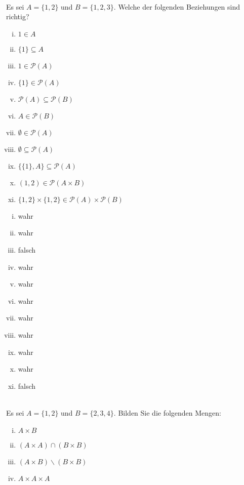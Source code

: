 \\
Es sei $A=\{1,2\}$ und $B=\{1,2,3\}$. Welche der folgenden Beziehungen sind richtig?
\begin{enumerate}[(i)]
  \item $1\in A$
  \item $\{1\}\subseteq A$
  \item $1\in\mathscr{P}(A)$
  \item $\{1\}\in\mathscr{P}(A)$
  \item $\mathscr{P}(A)\subseteq\mathscr{P}(B)$
  \item $A\in\mathscr{P}(B)$
  \item $\emptyset\in\mathscr{P}(A)$
  \item $\emptyset\subseteq\mathscr{P}(A)$
  \item $\{\{1\},A\}\subseteq\mathscr{P}(A)$
  \item $(1,2)\in\mathscr{P}(A\times B)$
  \item $\{1,2\}\times\{1,2\}\in\mathscr{P}(A)\times\mathscr{P}(B)$
\end{enumerate}

\begin{loesung}
  \begin{enumerate}[(i)]
    \item wahr
    \item wahr
    \item falsch
    \item wahr
    \item wahr
    \item wahr
    \item wahr
    \item wahr
    \item wahr
    \item wahr
    \item falsch
  \end{enumerate}
\end{loesung}

\\
Es sei $A=\{1,2\}$ und $B=\{2,3,4\}$.
Bilden Sie die folgenden Mengen:
\begin{enumerate}[(i)]
  \item $A\times B$
  \item $(A\times A)\cap (B\times B)$
  \item $(A\times B)\backslash (B\times B)$
  \item $A\times A\times A$
\end{enumerate}

